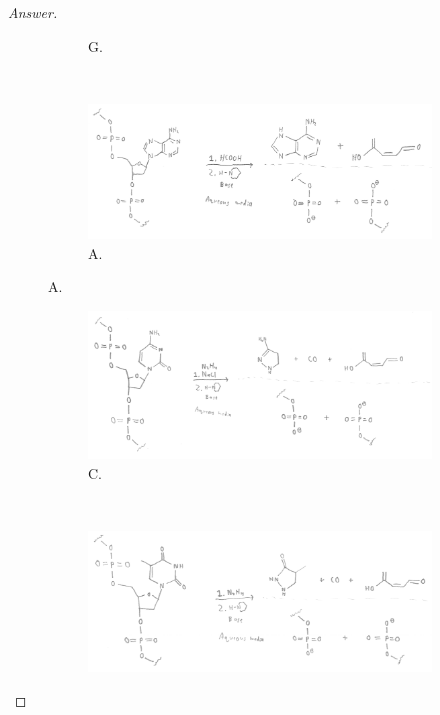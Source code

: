 \documentclass[../psets.tex]{subfiles}
\begin{document}
\begin{enumerate}
\begin{proof}[Answer]
\begin{figure}[H]
\begin{subfigure}[b]{\linewidth}
                \caption{G.}
                \label{fig:pset3-netRxnG}
            \end{subfigure}\\[2em]
            \begin{subfigure}[b]{\linewidth}
                \centering
                \includegraphics[width=\linewidth]{../ExtFiles/pset3-netRxnA.png}
                \caption{A.}
                \label{fig:pset3-netRxnA}
            \end{subfigure}
        \end{figure}
        \begin{figure}[H]
            \ContinuedFloat
            \centering
            \begin{subfigure}[b]{\linewidth}
                \centering
                \includegraphics[width=\linewidth]{../ExtFiles/pset3-netRxnC.png}
                \caption{C.}
                \label{fig:pset3-netRxnC}
            \end{subfigure}\\[2em]
            \begin{subfigure}[b]{\linewidth}
                \centering
                \includegraphics[width=\linewidth]{../ExtFiles/pset3-netRxnT.png}

\end{subfigure}
\end{figure}
\end{proof}
\end{enumerate}
\end{document}
